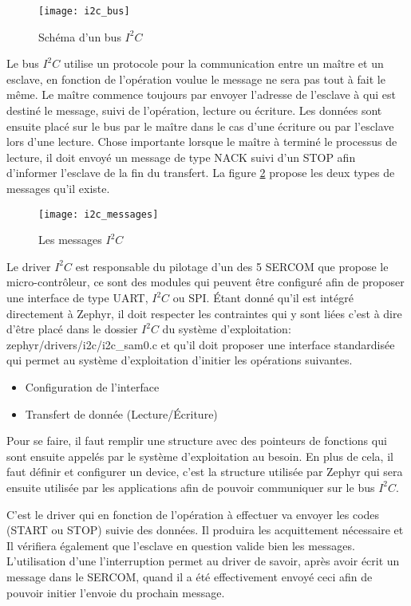 \begin{figure}[htb]
\centering 
\texttt{[image: i2c\_bus]} 
\caption{Schéma d'un bus $I^{2}C$}
\label{fig:i2c_bus}
\end{figure}

Le bus $I^{2}C$ utilise un protocole pour la communication entre un maître et un esclave, en fonction de l'opération voulue le message ne sera pas tout à fait le même. Le maître commence toujours par envoyer l'adresse de l'esclave à qui est destiné le message, suivi de l'opération, lecture ou écriture. Les données sont ensuite placé sur le bus par le maître dans le cas d'une écriture ou par l'esclave lors d'une lecture. Chose importante lorsque le maître à terminé le processus de lecture, il doit envoyé un message de type NACK suivi d'un STOP afin d'informer l'esclave de la fin du transfert.
La figure \ref{fig:i2c_messages} propose les deux types de messages qu'il existe.

\begin{figure}[htb]
\centering 
\texttt{[image: i2c\_messages]} 
\caption{Les messages $I^{2}C$}
\label{fig:i2c_messages}
\end{figure}

Le driver $I^{2}C$ est responsable du pilotage d'un des 5 SERCOM que propose le micro-contrôleur, ce sont des modules qui peuvent être configuré afin de proposer une interface de type UART, $I^{2}C$ ou SPI. Étant donné qu'il est intégré directement à Zephyr, il doit respecter les contraintes qui y sont liées c'est à dire d'être placé dans le dossier $I^{2}C$ du système d'exploitation: zephyr/drivers/i2c/i2c\_sam0.c et qu'il doit proposer une interface standardisée qui permet au système d'exploitation d'initier les opérations suivantes.

\begin{itemize}
\item Configuration de l'interface
\item Transfert de donnée (Lecture/Écriture)
\end{itemize}

Pour se faire, il faut remplir une structure avec des pointeurs de fonctions qui sont ensuite appelés par le système d'exploitation au besoin. En plus de cela, il faut définir et configurer un device, c'est la structure utilisée par Zephyr qui sera ensuite utilisée par les applications afin de pouvoir communiquer sur le bus $I^{2}C$.

C'est le driver qui en fonction de l'opération à effectuer va envoyer les codes (START ou STOP) suivie des données. Il produira les acquittement nécessaire et Il vérifiera également que l'esclave en question valide bien les messages. L'utilisation d'une l'interruption permet au driver de savoir, après avoir écrit un message dans le SERCOM, quand il a été effectivement envoyé ceci afin de pouvoir initier l'envoie du prochain message.

